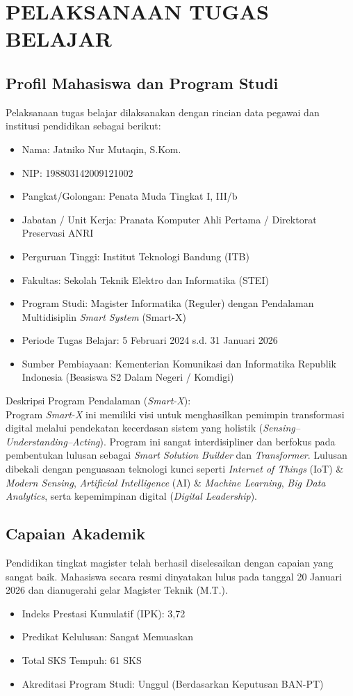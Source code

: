 \documentclass[11pt, a4paper]{article}
\begin{document}
\section{PELAKSANAAN TUGAS BELAJAR}

\subsection{Profil Mahasiswa dan Program Studi}
Pelaksanaan tugas belajar dilaksanakan dengan rincian data pegawai dan institusi pendidikan sebagai berikut:
\begin{itemize}
    \item Nama: Jatniko Nur Mutaqin, S.Kom.
    \item NIP: 198803142009121002
    \item Pangkat/Golongan: Penata Muda Tingkat I, III/b
    \item Jabatan / Unit Kerja: Pranata Komputer Ahli Pertama / Direktorat Preservasi ANRI
    \item Perguruan Tinggi: Institut Teknologi Bandung (ITB)
    \item Fakultas: Sekolah Teknik Elektro dan Informatika (STEI)
    \item Program Studi: Magister Informatika (Reguler) dengan Pendalaman Multidisiplin \textit{Smart System} (Smart-X)
    \item Periode Tugas Belajar: 5 Februari 2024 s.d. 31 Januari 2026
    \item Sumber Pembiayaan: Kementerian Komunikasi dan Informatika Republik Indonesia (Beasiswa S2 Dalam Negeri / Komdigi)
\end{itemize}

Deskripsi Program Pendalaman (\textit{Smart-X}):\\
Program \textit{Smart-X} ini memiliki visi untuk menghasilkan pemimpin transformasi digital melalui pendekatan kecerdasan sistem yang holistik (\textit{Sensing--Understanding--Acting}). Program ini sangat interdisipliner dan berfokus pada pembentukan lulusan sebagai \textit{Smart Solution Builder} dan \textit{Transformer}. Lulusan dibekali dengan penguasaan teknologi kunci seperti \textit{Internet of Things} (IoT) \& \textit{Modern Sensing}, \textit{Artificial Intelligence} (AI) \& \textit{Machine Learning}, \textit{Big Data Analytics}, serta kepemimpinan digital (\textit{Digital Leadership}).

\subsection{Capaian Akademik}
Pendidikan tingkat magister telah berhasil diselesaikan dengan capaian yang sangat baik. Mahasiswa secara resmi dinyatakan lulus pada tanggal 20 Januari 2026 dan dianugerahi gelar Magister Teknik (M.T.). 
\begin{itemize}
    \item Indeks Prestasi Kumulatif (IPK): 3,72
    \item Predikat Kelulusan: Sangat Memuaskan
    \item Total SKS Tempuh: 61 SKS
    \item Akreditasi Program Studi: Unggul (Berdasarkan Keputusan BAN-PT)
\end{itemize}
\end{document}
